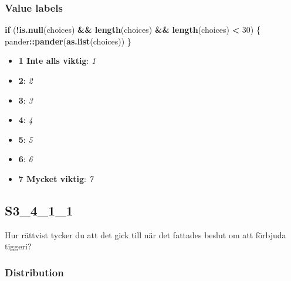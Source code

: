 \documentclass[]{book}
\newenvironment{Shaded}{\begin{snugshade}}{\end{snugshade}}
\newcommand{\KeywordTok}[1]{\textcolor[rgb]{0.13,0.29,0.53}{\textbf{#1}}}
\newcommand{\DecValTok}[1]{\textcolor[rgb]{0.00,0.00,0.81}{#1}}
\newcommand{\StringTok}[1]{\textcolor[rgb]{0.31,0.60,0.02}{#1}}
\newcommand{\ControlFlowTok}[1]{\textcolor[rgb]{0.13,0.29,0.53}{\textbf{#1}}}
\newcommand{\OperatorTok}[1]{\textcolor[rgb]{0.81,0.36,0.00}{\textbf{#1}}}
\newcommand{\NormalTok}[1]{#1}
\providecommand{\tightlist}{%
  \setlength{\itemsep}{0pt}\setlength{\parskip}{0pt}}
\begin{document}
\subsubsection{Value labels}\label{S3_2_1_labels}

\begin{Shaded}
\begin{Highlighting}[]
\ControlFlowTok{if}\NormalTok{ (}\OperatorTok{!}\KeywordTok{is.null}\NormalTok{(choices) }\OperatorTok{&&}\StringTok{ }\KeywordTok{length}\NormalTok{(choices) }\OperatorTok{&&}\StringTok{ }\KeywordTok{length}\NormalTok{(choices) }\OperatorTok{<}\StringTok{ }\DecValTok{30}\NormalTok{) \{}
\NormalTok{    pander}\OperatorTok{::}\KeywordTok{pander}\NormalTok{(}\KeywordTok{as.list}\NormalTok{(choices))}
\NormalTok{\}}
\end{Highlighting}
\end{Shaded}

\begin{itemize}
\tightlist
\item
  \textbf{1 Inte alls viktig}: \emph{1}
\item
  \textbf{2}: \emph{2}
\item
  \textbf{3}: \emph{3}
\item
  \textbf{4}: \emph{4}
\item
  \textbf{5}: \emph{5}
\item
  \textbf{6}: \emph{6}
\item
  \textbf{7 Mycket viktig}: \emph{7}
\end{itemize}

\subsection{S3\_4\_1\_1}\label{S3_4_1_1}

Hur rättvist tycker du att det gick till när det fattades beslut om att
förbjuda tiggeri?

\subsubsection{Distribution}\label{S3_4_1_1_distribution}
\end{document}
